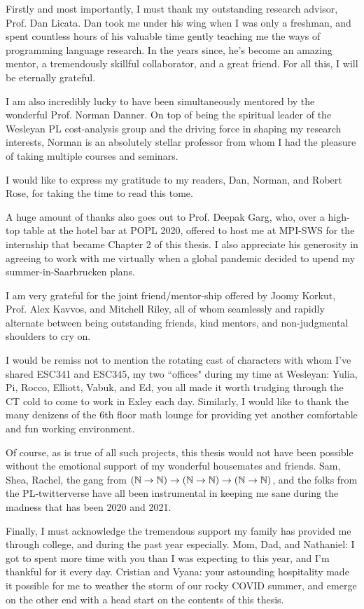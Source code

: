 \documentclass[final]{westhesis}
\begin{document}
\begin{acknowledgements}
Firstly and most importantly, I must thank my outstanding research advisor, Prof. Dan Licata. Dan took me under his wing when I was only a freshman, and spent countless hours of his valuable time gently teaching me the ways of programming language research. In the years since, he's become an amazing mentor, a tremendously skillful collaborator, and a great friend. For all this, I will be eternally grateful.

I am also incredibly lucky to have been simultaneously mentored by the wonderful Prof. Norman Danner. On top of being the spiritual leader of the Wesleyan PL cost-analysis group and the driving force in shaping my research interests, Norman is an absolutely stellar professor from whom I had the pleasure of taking multiple courses and seminars.

I would like to express my gratitude to my readers, Dan, Norman, and Robert Rose, for taking the time to read this tome.

A huge amount of thanks also goes out to Prof. Deepak Garg, who, over a high-top table at the hotel bar at POPL 2020, offered to host me at MPI-SWS for the internship that became Chapter 2 of this thesis. I also appreciate his generosity in agreeing to work with me virtually when a global pandemic decided to upend my summer-in-Saarbrucken plans.

I am very grateful for the joint friend/mentor-ship offered by Joomy Korkut, Prof. Alex Kavvos, and Mitchell Riley, all of whom seamlessly and rapidly alternate between being outstanding friends, kind mentors, and non-judgmental shoulders to cry on.

I would be remiss not to mention the rotating cast of characters with whom I've shared ESC341 and ESC345, my two ``offices" during my time at Wesleyan: Yulia, Pi, Rocco, Elliott, Vabuk, and Ed, you all made it worth trudging through the CT cold to come to work in Exley each day. Similarly, I would like to thank the many denizens of the 6th floor math lounge for providing yet another comfortable and fun working environment.

Of course, as is true of all such projects, this thesis would not have been possible without the emotional support of my wonderful housemates and friends. Sam, Shea, Rachel, the gang from $(\mathbb{N} \to \mathbb{N}) \to (\mathbb{N} \to \mathbb{N}) \to (\mathbb{N} \to \mathbb{N})$, and the folks from the PL-twitterverse have all been instrumental in keeping me sane during the madness that has been 2020 and 2021.

Finally, I must acknowledge the tremendous support my family has provided me through college, and during the past year especially. Mom, Dad, and Nathaniel: I got to spent more time with you than I was expecting to this year, and I'm thankful for it every day. Cristian and Vyana: your astounding hospitality made it possible for me to weather the storm of our rocky COVID summer, and emerge on the other end with a head start on the contents of this thesis.
\end{acknowledgements}
\end{document}
